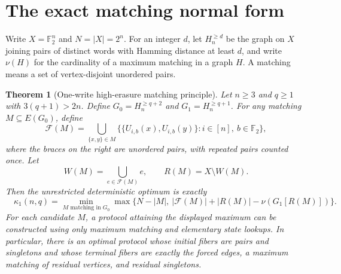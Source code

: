 \documentclass[11pt,a4paper]{article}
\newtheorem{theorem}{Theorem}[section]
\newcommand{\F}{\mathbb F_2}
\begin{document}
\section{The exact matching normal form}
Write $X=\F^n$ and $N=|X|=2^n$. For an integer $d$, let $H_n^{\ge d}$ be the graph on $X$ joining pairs of distinct words with Hamming distance at least $d$, and write $\nu(H)$ for the cardinality of a maximum matching in a graph $H$. A matching means a set of vertex-disjoint unordered pairs.
\begin{theorem}[One-write high-erasure matching principle]\label{thm:normal}
Let $n\ge3$ and $q\ge1$ with $3(q+1)>2n$. Define $G_0=H_n^{\ge q+2}$ and $G_1=H_n^{\ge q+1}$. For any matching $M\subseteq E(G_0)$, define
\[
 \mathcal F(M)=\bigcup_{\{x,y\}\in M}\bigl\{\{U_{i,b}(x),U_{i,b}(y)\}:i\in[n],\ b\in\F\bigr\},
\]
where the braces on the right are unordered pairs, with repeated pairs counted once. Let
\[
 W(M)=\bigcup_{e\in\mathcal F(M)}e,\qquad
 R(M)=X\setminus W(M).
\]
Then the unrestricted deterministic optimum is exactly
\begin{equation}\label{eq:normal}
\boxed{\quad\kappa_1(n,q)=\min_{M\text{ matching in }G_0}
\max\bigl\{N-|M|,\ |\mathcal F(M)|+|R(M)|-\nu(G_1[R(M)])\bigr\}.\quad}
\end{equation}
For each candidate $M$, a protocol attaining the displayed maximum can be constructed using only maximum matching and elementary state lookups. In particular, there is an optimal protocol whose initial fibers are pairs and singletons and whose terminal fibers are exactly the forced edges, a maximum matching of residual vertices, and residual singletons.
\end{theorem}
\end{document}
